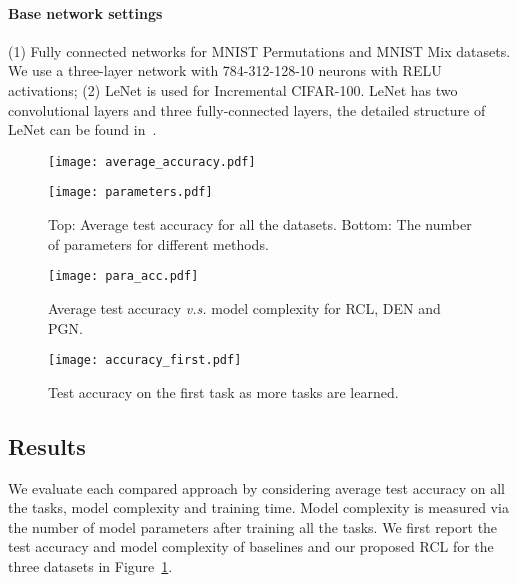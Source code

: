 \documentclass{article}
\begin{document}
\paragraph{Base network settings}
(1) Fully con{}nected networks for  MNIST Permutations and MNIST Mix datasets. We use a three-layer network with 784-312-128-10 neurons with RELU activations;
(2) LeNet is used for Incremental CIFAR-100. LeNet has two convolutional layers and three fully-connected layers, the detailed structure of {}LeNet can be found in~\cite{lenet1}.





\begin{figure}[htbp]
  \centering
    \begin{minipage}[b]{0.85\textwidth}
      \texttt{[image: average\_accuracy.pdf]}
    \end{minipage}
      \begin{minipage}[b]{0.85\textwidth}
    \texttt{[image: parameters.pdf]}
  \end{minipage}
  \caption{Top: Average test accuracy for all the datasets. Bottom: The number of parameters  for different methods. } \label{experiments}
\end{figure}



\begin{figure}[htbp]
  \texttt{[image: para\_acc.pdf]}
  \vspace{-0.5cm}
  \caption{Average test accuracy \emph{v.s.} model complexity for RCL, DEN and PGN.}
  \label{fig:accvspara}
\end{figure}

\begin{figure}[htbp]
  \centering
      \texttt{[image: accuracy\_first.pdf]}
      \vspace{-0.5cm}
  \caption{Test accuracy on the first task as more tasks are learned.} \label{fig:forgetting}
\end{figure}





\subsection{Results}
We evaluate each compared approach by considering  average test accuracy on all the tasks, model complexity and training time. Model complexity is measured via the number of model parameters after training all the tasks. We first report the test accuracy and model complexity of baselines and our proposed RCL for the three datasets in Figure~\ref{experiments}. 
\end{document}
